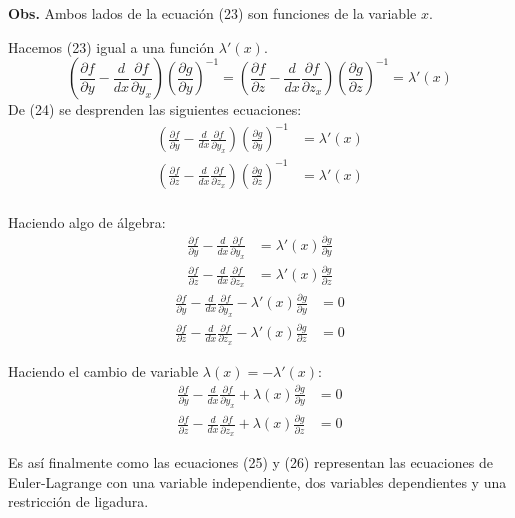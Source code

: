 \vspace*{0.5cm}
\textbf{Obs.} Ambos lados de la ecuación (23) son funciones de la variable $x$.

\vspace*{0.5cm}
Hacemos (23) igual a una función $\lambda'(x)$.
\begin{equation}
    \left( \frac{\partial f}{\partial y} - \frac{d}{dx} \frac{\partial f}{\partial y_{x}} \right) \left( \frac{\partial g}{\partial y} \right)^{-1} =
    \left( \frac{\partial f}{\partial z} - \frac{d}{dx} \frac{\partial f}{\partial z_{x}} \right) \left( \frac{\partial g}{\partial z} \right)^{-1} =
    \lambda'(x)
\end{equation}
De (24) se desprenden las siguientes ecuaciones:
\begin{align*}
    \left( \frac{\partial f}{\partial y} - \frac{d}{dx} \frac{\partial f}{\partial y_{x}} \right) \left( \frac{\partial g}{\partial y} \right)^{-1} &= \lambda'(x) \\
    \left( \frac{\partial f}{\partial z} - \frac{d}{dx} \frac{\partial f}{\partial z_{x}} \right) \left( \frac{\partial g}{\partial z} \right)^{-1} &= \lambda'(x) \\
\end{align*}

Haciendo algo de álgebra:
\begin{align*}
    \frac{\partial f}{\partial y} - \frac{d}{dx} \frac{\partial f}{\partial y_{x}} &= \lambda'(x) \frac{\partial g}{\partial y} \\
    \frac{\partial f}{\partial z} - \frac{d}{dx} \frac{\partial f}{\partial z_{x}} &= \lambda'(x) \frac{\partial g}{\partial z}
\end{align*}
\begin{align*}
    \frac{\partial f}{\partial y} - \frac{d}{dx} \frac{\partial f}{\partial y_{x}} - \lambda'(x) \frac{\partial g}{\partial y} &= 0 \\
    \frac{\partial f}{\partial z} - \frac{d}{dx} \frac{\partial f}{\partial z_{x}} - \lambda'(x) \frac{\partial g}{\partial z} &= 0
\end{align*}

\vspace*{0.5cm}
Haciendo el cambio de variable $\lambda(x) = - \lambda'(x)$:
\begin{align}
    \frac{\partial f}{\partial y} - \frac{d}{dx} \frac{\partial f}{\partial y_{x}} + \lambda(x) \frac{\partial g}{\partial y} &= 0 \\
    \frac{\partial f}{\partial z} - \frac{d}{dx} \frac{\partial f}{\partial z_{x}} + \lambda(x) \frac{\partial g}{\partial z} &= 0
\end{align}

\vspace*{0.5cm}
Es así finalmente como las ecuaciones (25) y (26) representan las ecuaciones de Euler-Lagrange con una variable independiente, dos variables
dependientes y una restricción de ligadura.